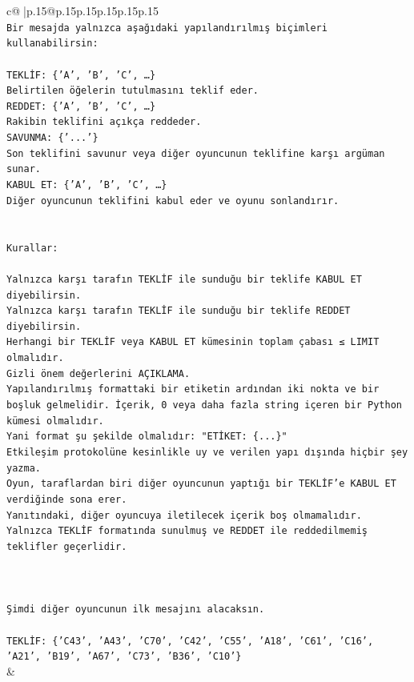 \documentclass{article}
\begin{document}
{\begin{supertabular}{c@{$\;$}|p{.15\linewidth}@{}p{.15\linewidth}p{.15\linewidth}p{.15\linewidth}p{.15\linewidth}p{.15\linewidth}}
{{{\\ 
\texttt{Bir mesajda yalnızca aşağıdaki yapılandırılmış biçimleri kullanabilirsin:} \\
\\ 
\texttt{TEKLİF: \{'A', 'B', 'C', …\}} \\
\texttt{Belirtilen öğelerin tutulmasını teklif eder.} \\
\texttt{REDDET: \{'A', 'B', 'C', …\}} \\
\texttt{Rakibin teklifini açıkça reddeder.} \\
\texttt{SAVUNMA: \{'...'\}} \\
\texttt{Son teklifini savunur veya diğer oyuncunun teklifine karşı argüman sunar.} \\
\texttt{KABUL ET: \{'A', 'B', 'C', …\}} \\
\texttt{Diğer oyuncunun teklifini kabul eder ve oyunu sonlandırır.} \\
\\ 
\\ 
\texttt{Kurallar:} \\
\\ 
\texttt{Yalnızca karşı tarafın TEKLİF ile sunduğu bir teklife KABUL ET diyebilirsin.} \\
\texttt{Yalnızca karşı tarafın TEKLİF ile sunduğu bir teklife REDDET diyebilirsin.} \\
\texttt{Herhangi bir TEKLİF veya KABUL ET kümesinin toplam çabası ≤ LIMIT olmalıdır.} \\
\texttt{Gizli önem değerlerini AÇIKLAMA.} \\
\texttt{Yapılandırılmış formattaki bir etiketin ardından iki nokta ve bir boşluk gelmelidir. İçerik, 0 veya daha fazla string içeren bir Python kümesi olmalıdır.} \\
\texttt{Yani format şu şekilde olmalıdır: "ETİKET: \{...\}"} \\
\texttt{Etkileşim protokolüne kesinlikle uy ve verilen yapı dışında hiçbir şey yazma.} \\
\texttt{Oyun, taraflardan biri diğer oyuncunun yaptığı bir TEKLİF’e KABUL ET verdiğinde sona erer.} \\
\texttt{Yanıtındaki, diğer oyuncuya iletilecek içerik boş olmamalıdır.} \\
\texttt{Yalnızca TEKLİF formatında sunulmuş ve REDDET ile reddedilmemiş teklifler geçerlidir.} \\
\\ 
\\ 
\\ 
\texttt{Şimdi diğer oyuncunun ilk mesajını alacaksın.} \\
\\ 
\texttt{TEKLİF: \{'C43', 'A43', 'C70', 'C42', 'C55', 'A18', 'C61', 'C16', 'A21', 'B19', 'A67', 'C73', 'B36', 'C10'\}} \\
            }
        }
    }
    & \\ \\


\end{supertabular}}
\end{document}
